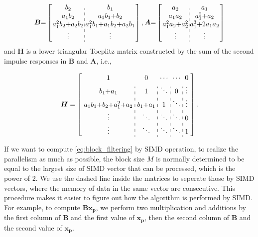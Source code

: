\begin{equation*}
    \begin{aligned}
          \bm{B} {=} \left[\arraycolsep=1.0pt\def\arraystretch{1.0}
            \begin{array}{c:c}
        b_2 & b_1 \\ 
        a_1b_2 & a_1b_1{+}b_2 \\
        a_1^2b_2{+}a_2b_2 & a_1^2b_1{+}a_1b_2{+}a_2b_1 \\
        \vdots & \vdots \\
        \end{array}\right], 
        \bm{A} {=} \left[\arraycolsep=1.0pt\def\arraystretch{1.0}
            \begin{array}{c:c} 
            a_2 & a_1 \\ 
            a_1a_2 & a_1^2{+}a_2 \\
            a_1^2a_2{+}a_2^2 & a_1^3{+}2a_1a_2 \\
            \vdots & \vdots \\
            \end{array}\right]
        \end{aligned}
\end{equation*}
and $\bm{H}$ is a lower triangular Toeplitz matrix constructed by the sum of the second impulse responses in $\bm{B}$ and $\bm{A}$, 
i.e.,

\begin{equation*}
        \bm{H} = \left[\arraycolsep=3.0pt\def\arraystretch{1.2}
            \begin{array}{c:c:c:c:c}
            1 & 0 & \cdots & \cdots & 0 \\ 
            b_1{+}a_1 & 1 & \ddots & 0  & \vdots \\
            a_1b_1{+}b_2{+}a_1^2{+}a_2 & b_1{+}a_1 & 1 & \ddots & \vdots \\
            \vdots & \ddots & \ddots & \ddots & 0 \\
            \vdots & \ddots & \ddots & \ddots & 1 \\
            \end{array}\right].  \\
\end{equation*}

If we want to compute \eqref{eq:block_filtering} by SIMD operation, to realize the parallelism as much as possible,
the block size $M$ is normally determined to be equal to the largest size of SIMD vector that can be processed, which is the power of 2.
We use the dashed line inside the matrices to seperate those by SIMD vectors, 
where the memory of data in the same vector are consecutive.
This procedure makes it easier to figure out how the algorithm is performed by SIMD.
For example, to compute $\bm{B}\bm{x_p}$, we perform two multiplication and additions by the first column of $\bm{B}$ and the first value of $\bm{x_p}$,
then the second column of $\bm{B}$ and the second value of $\bm{x_p}$.

